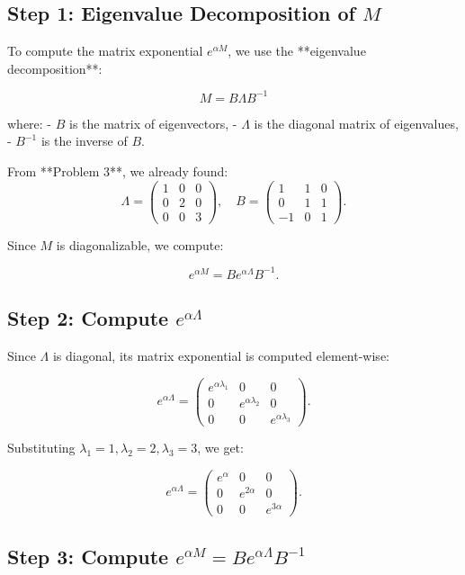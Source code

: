 \documentclass[12pt]{article}
\begin{document}
\subsection*{Step 1: Eigenvalue Decomposition of \( M \)}

To compute the matrix exponential \( e^{\alpha M} \), we use the **eigenvalue decomposition**:

\[
M = B \Lambda B^{-1}
\]

where:
- \( B \) is the matrix of eigenvectors,
- \( \Lambda \) is the diagonal matrix of eigenvalues,
- \( B^{-1} \) is the inverse of \( B \).

From **Problem 3**, we already found:
\[
\Lambda =
\begin{pmatrix}
1 & 0 & 0 \\
0 & 2 & 0 \\
0 & 0 & 3
\end{pmatrix}, \quad
B =
\begin{pmatrix}
1 & 1 & 0 \\
0 & 1 & 1 \\
-1 & 0 & 1
\end{pmatrix}.
\]

Since \( M \) is diagonalizable, we compute:

\[
e^{\alpha M} = B e^{\alpha \Lambda} B^{-1}.
\]

\subsection*{Step 2: Compute \( e^{\alpha \Lambda} \)}

Since \( \Lambda \) is diagonal, its matrix exponential is computed element-wise:

\[
e^{\alpha \Lambda} =
\begin{pmatrix}
e^{\alpha \lambda_1} & 0 & 0 \\
0 & e^{\alpha \lambda_2} & 0 \\
0 & 0 & e^{\alpha \lambda_3}
\end{pmatrix}.
\]

Substituting \( \lambda_1 = 1, \lambda_2 = 2, \lambda_3 = 3 \), we get:

\[
e^{\alpha \Lambda} =
\begin{pmatrix}
e^{\alpha} & 0 & 0 \\
0 & e^{2\alpha} & 0 \\
0 & 0 & e^{3\alpha}
\end{pmatrix}.
\]

\subsection*{Step 3: Compute \( e^{\alpha M} = B e^{\alpha \Lambda} B^{-1} \)}
\end{document}
